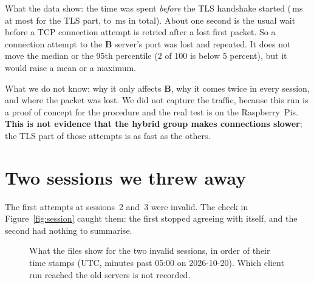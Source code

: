\documentclass[11pt,a4paper]{article}
\newcommand{\cB}{\textcolor{colorB}{\textbf{B}}}
\begin{document}
What the data show: the time was spent \emph{before} the TLS handshake started
(\SlowTlsMax{}\,ms at most for the TLS part, \SlowMin{} to \SlowMax{}\,ms in total). About one second
is the usual wait before a TCP connection attempt is retried after a lost first packet. So a
connection attempt to the \cB{} server's port was lost and repeated. It does not move the median or
the 95th percentile (2 of 100 is below 5 percent), but it would raise a mean or a maximum.

What we do not know: why it only affects \cB{}, why it comes twice in every session, and where the
packet was lost. We did not capture the traffic, because this run is a proof of concept for the
procedure and the real test is on the Raspberry~Pis. \textbf{This is not evidence that the hybrid
group makes connections slower}; the TLS part of those attempts is as fast as the others.

\section{Two sessions we threw away}
\label{sec:invalid}

The first attempts at sessions~2 and~3 were invalid. The check in Figure~\ref{fig:session} caught
them: the first stopped agreeing with itself, and the second had nothing to summarise.

\begin{figure}[!htbp]
\centering
{}
\caption{What the files show for the two invalid sessions, in order of their time stamps (UTC, minutes
past 05:00 on 2026-10-20). Which client run reached the old servers is not recorded.}
\label{fig:invalid}
\end{figure}
\end{document}
